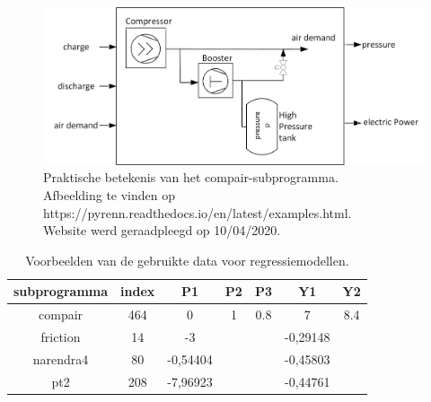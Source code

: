 		\begin{figure}
			\centering
			\includegraphics[width=120mm]{afbeeldingen/compairPraktijk.PNG}
			\caption{Praktische betekenis van het compair-subprogramma. \\Afbeelding te vinden op https://pyrenn.readthedocs.io/en/latest/examples.html.\\ Website werd geraadpleegd op 10/04/2020.}
			\label{fig:compairPraktijk}
		\end{figure}
	
		\begin{table}[]
			\centering
			\begin{tabular}{ccccccc}
				\hline
				subprogramma                   & index & P1       & P2 & P3  & Y1       & Y2  \\ \hline
				\multicolumn{1}{c|}{compair}   & 464   & 0        & 1  & 0.8 & 7        & 8.4 \\
				\multicolumn{1}{c|}{friction}  & 14    & -3       &    &     & -0,29148 &     \\
				\multicolumn{1}{c|}{narendra4} & 80    & -0,54404 &    &     & -0,45803 &     \\
				\multicolumn{1}{c|}{pt2}       & 208   & -7,96923 &    &     & -0,44761 &     \\ \hline
			\end{tabular}
			\caption{Voorbeelden van de gebruikte data voor regressiemodellen.}
			\label{tab:dataVoorbeelden}
		\end{table}
	
